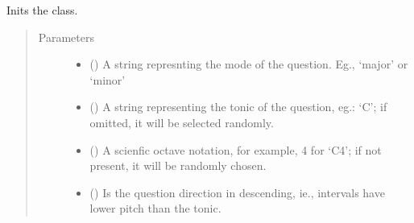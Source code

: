 \documentclass[letterpaper,10pt,english]{sphinxmanual}
\begin{document}
\begin{fulllineitems}
\begin{fulllineitems}
\label{\detokenize{index:birdears.questionbase.QuestionBase.__init__}}
\sphinxAtStartPar
Inits the class.
\begin{quote}\begin{description}
\item[{Parameters}] \leavevmode\begin{itemize}
\item {} 
\sphinxAtStartPar
{} () \textendash{} A string represnting the mode of the question.
Eg., ‘major’ or ‘minor’

\item {} 
\sphinxAtStartPar
{} () \textendash{} A string representing the tonic of the
question, eg.: ‘C’; if omitted, it will be selected
randomly.

\item {} 
\sphinxAtStartPar
{} () \textendash{} A scienfic octave notation, for example,
4 for ‘C4’; if not present, it will be randomly chosen.

\item {} 
\sphinxAtStartPar
{} () \textendash{} Is the question direction in descending,
ie., intervals have lower pitch than the tonic.


\end{itemize}
\end{description}
\end{quote}
\end{fulllineitems}
\end{fulllineitems}
\end{document}
